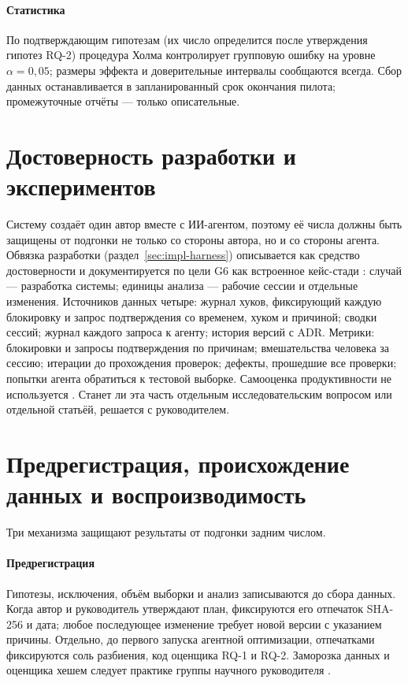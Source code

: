\paragraph{Статистика} По подтверждающим гипотезам (их число определится после утверждения гипотез RQ-2) процедура Холма контролирует
групповую ошибку на уровне $\alpha=0{,}05$; размеры эффекта и доверительные интервалы сообщаются всегда. Сбор
данных останавливается в запланированный срок окончания пилота; промежуточные отчёты --- только описательные.

\section{Достоверность разработки и экспериментов}\label{sec:method-harness}

Систему создаёт один автор вместе с ИИ-агентом, поэтому её числа должны быть защищены от подгонки не только
со стороны автора, но и со стороны агента. Обвязка разработки (раздел~\ref{sec:impl-harness}) описывается
как средство достоверности и документируется по цели G6 как встроенное кейс-стади \cite{SRC-102}: случай ---
разработка системы; единицы анализа --- рабочие сессии и отдельные изменения. Источников данных четыре: журнал
хуков, фиксирующий каждую блокировку и запрос подтверждения со временем, хуком и причиной; сводки сессий;
журнал каждого запроса к агенту; история версий с ADR. Метрики: блокировки и запросы подтверждения по
причинам; вмешательства человека за сессию; итерации до прохождения проверок; дефекты, прошедшие все проверки;
попытки агента обратиться к тестовой выборке. Самооценка продуктивности не используется \cite{SRC-030}. Станет
ли эта часть отдельным исследовательским вопросом или отдельной статьёй, решается с руководителем.

\section{Предрегистрация, происхождение данных и воспроизводимость}\label{sec:method-prov}

Три механизма защищают результаты от подгонки задним числом.

\paragraph{Предрегистрация} Гипотезы, исключения, объём выборки и анализ записываются до сбора данных.
Когда автор и руководитель утверждают план, фиксируются его отпечаток SHA-256 и дата; любое последующее
изменение требует новой версии с указанием причины. Отдельно, до первого запуска агентной оптимизации, отпечатками фиксируются
соль разбиения, код оценщика RQ-1 и RQ-2. Заморозка данных и оценщика хешем следует практике группы
научного руководителя \cite{SRC-067}.

